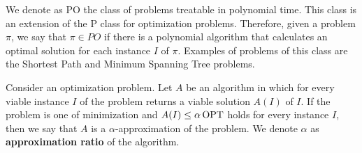 
We denote as PO the class of problems treatable in polynomial time. This class is an extension of the P class for optimization problems. Therefore, given a problem \(\pi\), we say that \(\pi \in PO\) if there is a polynomial algorithm that calculates an optimal solution for each instance \(I\) of \(\pi\). Examples of problems of this class are the Shortest Path and Minimum Spanning Tree problems.


Consider an optimization problem. Let \(A\) be an algorithm in which for every viable instance \(I\) of the problem returns a viable solution \(A(I)\) of \(I\). If the problem is one of minimization and \(A(I) \leq \alpha \operatorname{\textrm{OPT}}\) holds for every instance \(I\), then we say that \(A\) is a \(\alpha\)-approximation of the problem. We denote \(\alpha\) as \textbf{approximation ratio} of the algorithm.



